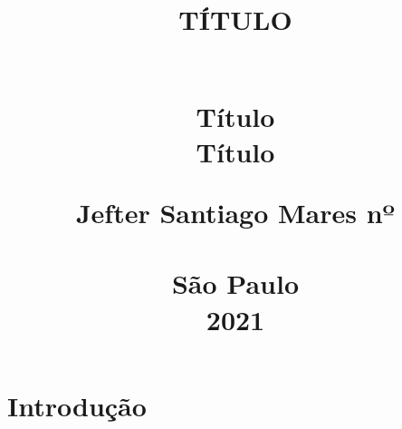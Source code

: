 \documentclass[a4paper, 12pt]{article}
\title{
   \begin{center}
        \Huge{
        \textbf{ TÍTULO }
        \vspace{1em}
        \begin{figure}[h]
\end{figure}
       \vspace{0.5em} \\
        \Large{Título}
        \vspace{0.5em} \\
       \large{ Título }
        }
        \vspace*{\fill}
        \large{
        Jefter Santiago Mares nº \\
        }
        \vspace*{\fill}
      \\São Paulo \\  2021
\newpage
\end{center}}
\date{}
\begin{document}
\maketitle
\section{Introdução}
\end{document}
